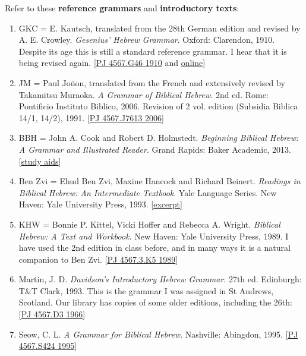 \documentclass[titlepage]{article}
\begin{document}
Refer to these \textbf{reference grammars} and \textbf{introductory texts}:

\begin{enumerate}

	\item GKC = E. Kautsch, translated from the 28th German edition and
	revised by A. E. Crowley. \emph{Gesenius' Hebrew Grammar}. Oxford:
	Clarendon, 1910. Despite its age this is still a standard reference
	grammar. I hear that it is being revised again.
	[\href{http://tyndale.worldcat.org/oclc/748712337}{PJ 4567.G46 1910} and \href{http://tyndale.worldcat.org/oclc/575651}{online}]

	\item JM = Paul Joüon, translated from the French and extensively
	revised by Takamitsu Muraoka. \emph{A Grammar of Biblical Hebrew}.
	2nd ed. Rome: Pontificio Instituto Biblico, 2006. Revision of 2 vol.
	edition (Subsidia Biblica 14/1, 14/2), 1991.
	[\href{http://tyndale.worldcat.org/oclc/76949728}{PJ 4567.J7613 2006}]

	\item BBH = John A. Cook and Robert D. Holmstedt. \emph{Beginning
	Biblical Hebrew: A Grammar and Illustrated Reader}. Grand Rapids:
	Baker Academic, 2013.
	[\href{http://bakeracademic.com/beginningbiblicalhebrew}{study aids}]

	\item Ben Zvi = Ehud Ben Zvi, Maxine Hancock and Richard Beinert.
	\emph{Readings in Biblical Hebrew: An Intermediate Textbook}. Yale
	Language Series. New Haven: Yale University Press, 1993.
	[\href{http://yalepress.yale.edu/yupbooks/languages/pdf/Zvi_excerpt.pdf}{excerpt}]

	\item KHW = Bonnie P. Kittel, Vicki Hoffer and Rebecca A. Wright.
	\emph{Biblical Hebrew: A Text and Workbook}. New Haven: Yale
	University Press, 1989. I have used the 2nd edition in class before,
	and in many ways it is a natural companion to Ben Zvi.
	[\href{http://tyndale.worldcat.org/oclc/18557541}{PJ 4567.3.K5 1989}]

	\item Martin, J. D. \emph{Davidson's Introductory Hebrew Grammar}.
	27th ed. Edinburgh: T\&T Clark, 1993. This is the grammar I was
	assigned in St Andrews, Scotland. Our library has copies of some
	older editions, including the 26th:
	[\href{http://tyndale.worldcat.org/oclc/456246}{PJ 4567.D3 1966}]

	\item Seow, C. L. \emph{A Grammar for Biblical Hebrew}. Nashville:
	Abingdon, 1995.
	[\href{http://tyndale.worldcat.org/oclc/32854250}{PJ 4567.S424 1995}]


\end{enumerate}
\end{document}
